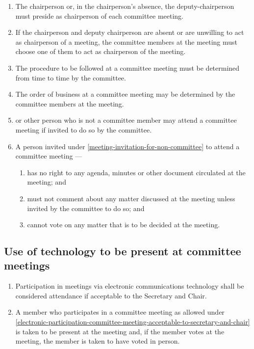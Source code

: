 \documentclass[../constitution.tex]{subfiles}
\begin{document}
\begin{enumerate}

\item The chairperson or, in the chairperson's absence, the deputy-chairperson must preside as chairperson of each committee meeting.
\item If the chairperson and deputy chairperson are absent or are unwilling to act as chairperson of a meeting, the committee members at the meeting must choose one of them to act as chairperson of the meeting.
\item The procedure to be followed at a committee meeting must be determined from time to time by the committee.
\item The order of business at a committee meeting may be determined by the committee members at the meeting.
\item {} or other person who is not a committee member may attend a committee meeting if invited to do so by the committee. \label{meeting-invitation-for-non-committee}
\item A person invited under  \ref{meeting-invitation-for-non-committee} to attend a committee meeting ---

  \begin{enumerate}
  
  \item has no right to any agenda, minutes or other document circulated at the meeting; and
  \item must not comment about any matter discussed at the meeting unless invited by the committee to do so; and
  \item cannot vote on any matter that is to be decided at the meeting.
  \end{enumerate}
\end{enumerate}

\hypertarget{use-of-technology-to-be-present-at-committee-meetings}{%
\subsection{Use of technology to be present at committee meetings}\label{use-of-technology-to-be-present-at-committee-meetings}}

\begin{enumerate}

\item Participation in meetings via electronic communications technology shall be considered attendance if acceptable to the Secretary and Chair. \label{electronic-participation-committee-meeting-acceptable-to-secretary-and-chair} 
\item A member who participates in a committee meeting as allowed under  \ref{electronic-participation-committee-meeting-acceptable-to-secretary-and-chair} is taken to be present at the meeting and, if the member votes at the meeting, the member is taken to have voted in person.
\end{enumerate}
\end{document}
